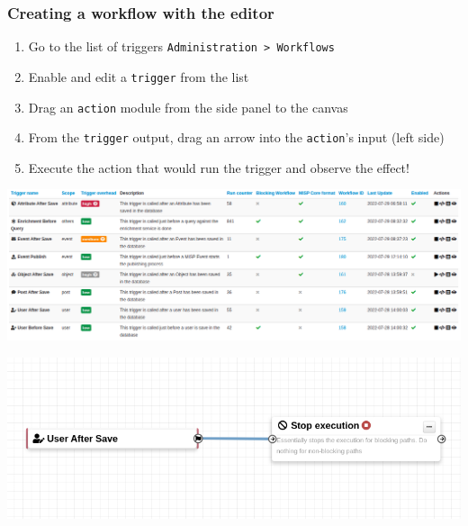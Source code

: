 \begin{frame}
    \frametitle{Creating a workflow with the editor}
    \begin{enumerate}
        \item Go to the list of triggers \texttt{Administration > Workflows}
        \item Enable and edit a \texttt{trigger} from the list
        \item Drag an \texttt{action} module from the side panel to the canvas
        \item From the \texttt{trigger} output, drag an arrow into the \texttt{action}'s input (left side)
        \item Execute the action that would run the trigger and observe the effect!
    \end{enumerate}
    \begin{center}
        \includegraphics[width=0.7\linewidth]{pictures/triggers.png}
    \end{center}
    \begin{center}
        \includegraphics[width=0.50\linewidth]{pictures/editor-1.png}
    \end{center}
\end{frame}

